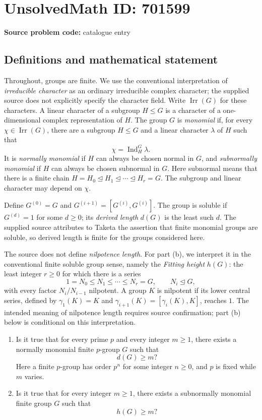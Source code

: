 \documentclass[11pt]{article}
\begin{document}
\section*{UnsolvedMath ID: 701599}
\textbf{Source problem code:} catalogue entry
\subsection{Definitions and mathematical statement}
Throughout, groups are finite. We use the conventional interpretation of \emph{irreducible character} as an ordinary irreducible complex character; the supplied source does not explicitly specify the character field. Write \(\operatorname{Irr}(G)\) for these characters. A linear character of a subgroup \(H\leq G\) is a character of a one-dimensional complex representation of \(H\). The group \(G\) is \emph{monomial} if, for every \(\chi\in\operatorname{Irr}(G)\), there are a subgroup \(H\leq G\) and a linear character \(\lambda\) of \(H\) such that
\[
\chi=\operatorname{Ind}_H^G\lambda.
\]
It is \emph{normally monomial} if \(H\) can always be chosen normal in \(G\), and \emph{subnormally monomial} if \(H\) can always be chosen subnormal in \(G\). Here subnormal means that there is a finite chain \(H=H_0\trianglelefteq H_1\trianglelefteq\cdots\trianglelefteq H_r=G\). The subgroup and linear character may depend on \(\chi\).

Define \(G^{(0)}=G\) and \(G^{(i+1)}=[G^{(i)},G^{(i)}]\). The group is soluble if \(G^{(d)}=1\) for some \(d\geq0\); its \emph{derived length} \(d(G)\) is the least such \(d\). The supplied source attributes to Taketa the assertion that finite monomial groups are soluble, so derived length is finite for the groups considered here.

The source does not define \emph{nilpotence length}. For part (b), we interpret it in the conventional finite soluble group sense, namely the \emph{Fitting height} \(h(G)\): the least integer \(r\geq0\) for which there is a series
\[
1=N_0\leq N_1\leq\cdots\leq N_r=G,
\qquad N_i\trianglelefteq G,
\]
with every factor \(N_i/N_{i-1}\) nilpotent. A group \(K\) is nilpotent if its lower central series, defined by \(\gamma_1(K)=K\) and \(\gamma_{i+1}(K)=[\gamma_i(K),K]\), reaches \(1\). The intended meaning of nilpotence length requires source confirmation; part (b) below is conditional on this interpretation.

\begin{enumerate}
\item[(a)] Is it true that for every prime \(p\) and every integer \(m\geq1\), there exists a normally monomial finite \(p\)-group \(G\) such that
\[
d(G)\geq m?
\]
Here a finite \(p\)-group has order \(p^n\) for some integer \(n\geq0\), and \(p\) is fixed while \(m\) varies.
\item[(b)] Is it true that for every integer \(m\geq1\), there exists a subnormally monomial finite group \(G\) such that
\[
h(G)\geq m?
\]
\end{enumerate}
\end{document}
